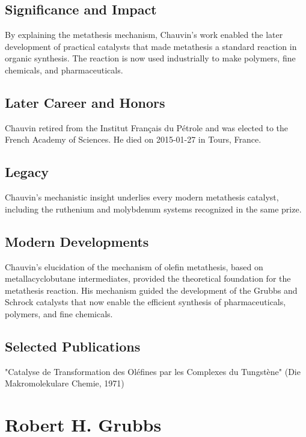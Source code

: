\subsection*{Significance and Impact}

By explaining the metathesis mechanism, Chauvin's work enabled the later development of practical catalysts that made metathesis a standard reaction in organic synthesis. The reaction is now used industrially to make polymers, fine chemicals, and pharmaceuticals.

\subsection*{Later Career and Honors}

Chauvin retired from the Institut Français du Pétrole and was elected to the French Academy of Sciences. He died on 2015-01-27 in Tours, France.

\subsection*{Legacy}

Chauvin's mechanistic insight underlies every modern metathesis catalyst, including the ruthenium and molybdenum systems recognized in the same prize.

\subsection*{Modern Developments}

Chauvin's elucidation of the mechanism of olefin metathesis, based on metallacyclobutane intermediates, provided the theoretical foundation for the metathesis reaction. His mechanism guided the development of the Grubbs and Schrock catalysts that now enable the efficient synthesis of pharmaceuticals, polymers, and fine chemicals.

\subsection*{Selected Publications}

"Catalyse de Transformation des Oléfines par les Complexes du Tungstène" (Die Makromolekulare Chemie, 1971)

\clearpage

\section{Robert H. Grubbs}

